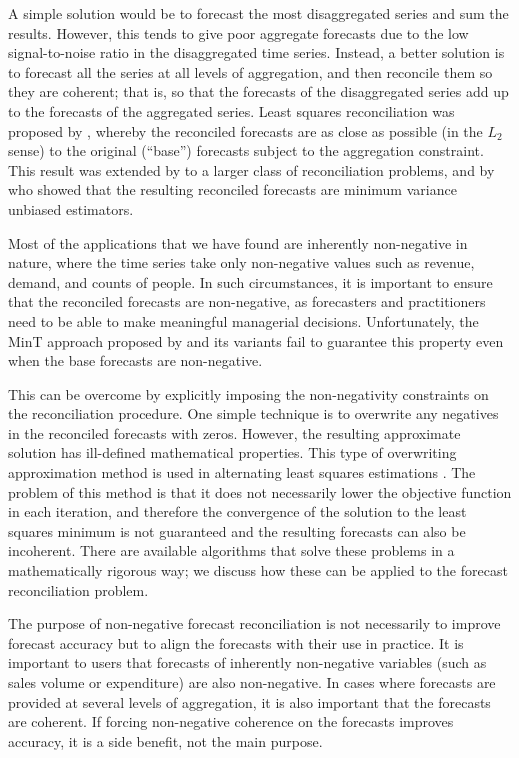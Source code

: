 \documentclass[twocolumn]{svjour3}
\begin{document}
A simple solution would be to forecast the most disaggregated series and sum the results. However, this tends to give poor aggregate forecasts due to the low signal-to-noise ratio in the disaggregated time series. Instead, a better solution is to forecast all the series at all levels of aggregation, and then reconcile them so they are coherent; that is, so that the forecasts of the disaggregated series add up to the forecasts of the aggregated series. Least squares reconciliation was proposed by \citet{Hyndman2011}, whereby the reconciled forecasts are as close as possible (in the $L_2$ sense) to the original (``base'') forecasts subject to the aggregation constraint. This result was extended by \citet{Hyndman2016} to a larger class of reconciliation problems, and by \citet{Wick2018} who showed that the resulting reconciled forecasts are minimum variance unbiased estimators.

Most of the applications that we have found are inherently non-negative in nature, where the time series take only non-negative values such as revenue, demand, and counts of people. In such circumstances, it is important to ensure that the reconciled forecasts are non-negative, as forecasters and practitioners need to be able to make meaningful managerial decisions. Unfortunately, the MinT approach proposed by \citet{Wick2018} and its variants fail to guarantee this property even when the base forecasts are non-negative.

This can be overcome by explicitly imposing the non-negativity constraints on the reconciliation procedure. One simple technique is to overwrite any negatives in the reconciled forecasts with zeros. However, the resulting approximate solution has ill-defined mathematical properties. This type of overwriting approximation method is used in alternating least squares estimations \citep{Berry2007, Karjalainen1991}. The problem of this method is that it does not necessarily lower the objective function in each iteration, and therefore the convergence of the solution to the least squares minimum is not guaranteed and the resulting forecasts can also be incoherent. There are available algorithms that solve these problems in a mathematically rigorous way; we discuss how these can be applied to the forecast reconciliation problem.

The purpose of non-negative forecast reconciliation is not necessarily to improve forecast accuracy but to align the forecasts with their use in practice. It is important to users that forecasts of inherently non-negative variables (such as sales volume or expenditure) are also non-negative. In cases where forecasts are provided at several levels of aggregation, it is also important that the forecasts are coherent. If forcing non-negative coherence on the forecasts improves accuracy, it is a side benefit, not the main purpose.
\end{document}
